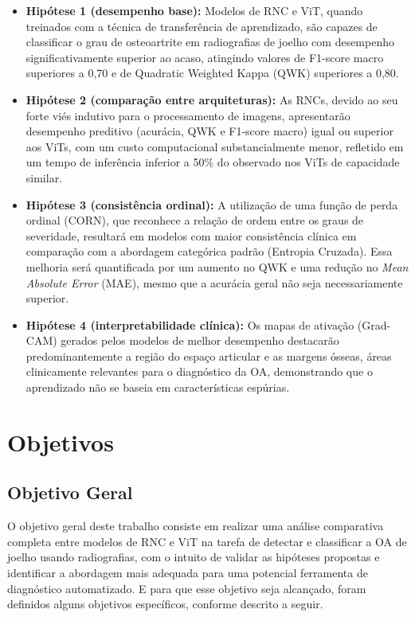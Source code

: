 \begin{itemize}
    \item \textbf{Hipótese 1 (desempenho base):} Modelos de RNC e ViT, quando treinados com a técnica de transferência de aprendizado, são capazes de classificar o grau de osteoartrite em radiografias de joelho com desempenho significativamente superior ao acaso, atingindo valores de F1-score macro superiores a 0,70 e de Quadratic Weighted Kappa (QWK) superiores a 0,80.

    \item \textbf{Hipótese 2 (comparação entre arquiteturas):} As RNCs, devido ao seu forte viés indutivo para o processamento de imagens, apresentarão desempenho preditivo (acurácia, QWK e F1-score macro) igual ou superior aos ViTs, com um custo computacional substancialmente menor, refletido em um tempo de inferência inferior a 50\% do observado nos ViTs de capacidade similar.
    
    \item \textbf{Hipótese 3 (consistência ordinal):} A utilização de uma função de perda ordinal (CORN), que reconhece a relação de ordem entre os graus de severidade, resultará em modelos com maior consistência clínica em comparação com a abordagem categórica padrão (Entropia Cruzada). Essa melhoria será quantificada por um aumento no QWK e uma redução no \textit{Mean Absolute Error} (MAE), mesmo que a acurácia geral não seja necessariamente superior.

    \item \textbf{Hipótese 4 (interpretabilidade clínica):} Os mapas de ativação (Grad-CAM) gerados pelos modelos de melhor desempenho destacarão predominantemente a região do espaço articular e as margens ósseas, áreas clinicamente relevantes para o diagnóstico da OA, demonstrando que o aprendizado não se baseia em características espúrias.
\end{itemize}

\section{Objetivos}

\subsection{Objetivo Geral}

O objetivo geral deste trabalho consiste em realizar uma análise comparativa completa entre modelos de RNC e ViT na tarefa de detectar e classificar a OA de joelho usando radiografias, com o intuito de validar as hipóteses propostas e identificar a abordagem mais adequada para uma potencial ferramenta de diagnóstico automatizado. E para que esse objetivo seja alcançado, foram definidos alguns objetivos específicos, conforme descrito a seguir.

